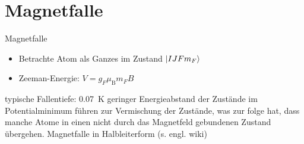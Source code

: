 \documentclass[12pt,xcolor=dvipsnames]{beamer}
\begin{document}
\section{Magnetfalle}

\begin{frame}{Magnetfalle}

\begin{itemize}
	\item Betrachte Atom als Ganzes im Zustand $\ket{I J F m_F}$
	\item Zeeman-Energie: $V = g_F \mu_\mathrm{B} m_F B$
\end{itemize}

typische Fallentiefe: \SI{0.07}{\kelvin}
geringer Energieabstand der Zustände im Potentialminimum führen zur Vermischung der Zustände, was zur folge hat, dass manche Atome in einen nicht durch das Magnetfeld gebundenen Zustand übergehen.
Magnetfalle in Halbleiterform (s. engl. wiki)
\end{frame}
\end{document}

